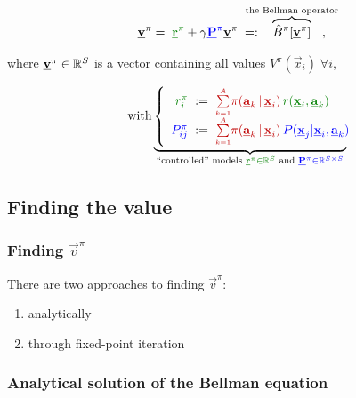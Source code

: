 \begin{frame}
	
	\begin{equation}
		\vec v^\pi
		= \; {\color{reward}\vec r^\pi} 
			+ \gamma {\color{trans}\vec P^\pi} \vec v^\pi \; =: \kern-3ex\overbrace{\hat B^\pi[\vec v^\pi]}^{\text{the Bellman operator}}\kern-3ex,
	\end{equation}
	
	where $\underline{\mathbf{v}}^\pi \in \mathbb{R}^S$ is a vector containing all values $V^\pi(\vec x_{i})\;\forall i$,
	
	\begin{align}
		\quad \text{with}  \underbrace{ \left\{ \begin{array}{rcl} 
				{\color{reward}r^\pi_i} &\kern-1ex:=\kern-1ex& 
					{\color{policy} \smallsum{k=1}{A} 
					\pi(\vec a_k \,|\, \vec x_i)} \, 
					{\color{reward} r(\vec x_i, \vec a_k)} \\
				{\color{trans}P^\pi_{ij}} &\kern-1ex:=\kern-1ex& 
					{\color{policy}\smallsum{k=1}{A} 
					\pi(\vec a_k \,|\, \vec x_i)} \, 
					{\color{trans}P(\vec x_j | \vec x_i, \vec a_k)} \\
			\end{array} 
			\right.\kern-2ex}_{
				\text{``controlled'' models }
				{\color{reward}\vec r^\pi \in \R^S}
				\text{ and }{\color{trans}\vec P^\pi \in \R^{S \times S}}
			}
	\end{align}
	
\end{frame}

\subsection{Finding the value}

\begin{frame}\frametitle{Finding $\vec v^\pi$}

There are two approaches to finding $\vec v^\pi$:

\begin{enumerate}
\item analytically
\item through fixed-point iteration
\end{enumerate}

\end{frame}

\subsubsection{Analytical solution of the Bellman equation}

